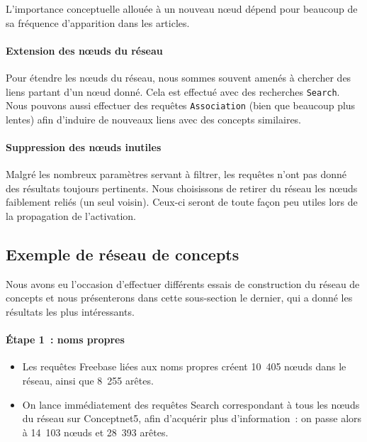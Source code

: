 \documentclass[a4paper, 12pt]{article}
\begin{document}
L'importance conceptuelle allouée à un nouveau n\oe{}ud dépend pour beaucoup de sa fréquence d'apparition dans les articles.


\paragraph{Extension des nœuds du réseau}

Pour étendre les n\oe{}uds du réseau, nous sommes souvent amenés à chercher des liens partant d'un n\oe{}ud donné. Cela est effectué avec des recherches \verb|Search|. Nous pouvons aussi effectuer des requêtes \verb|Association| (bien que beaucoup plus lentes) afin d'induire de nouveaux liens avec des concepts similaires.



\paragraph{Suppression des nœuds inutiles}
Malgré les nombreux paramètres servant à filtrer, les requêtes n'ont pas donné des résultats toujours pertinents. Nous choisissons de retirer du réseau les nœuds faiblement reliés (un seul voisin). Ceux-ci seront de toute fa\c{c}on peu utiles lors de la propagation de l'activation.


\subsection{Exemple de réseau de concepts}

Nous avons eu l'occasion d'effectuer différents essais de construction du réseau de concepts et nous présenterons dans cette sous-section le dernier, qui a donné les résultats les plus intéressants.

\paragraph{Étape 1~: noms propres}

\begin{itemize}
 \item Les requêtes Freebase liées aux noms propres créent 10~405 n\oe{}uds dans le réseau, ainsi que 8~255 arêtes.
 \item On lance immédiatement des requêtes Search correspondant à tous les n\oe{}uds du réseau sur Conceptnet5, afin d'acquérir plus d'information~: on passe alors à 14~103 n\oe{}uds et 28~393 arêtes.
\end{itemize}
\end{document}
